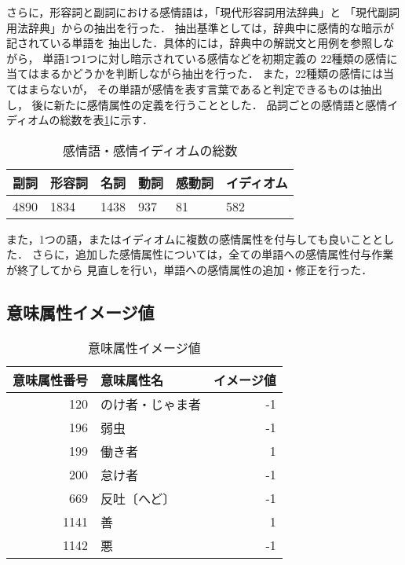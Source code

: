 \documentclass[japanese]{jnlp_1.3c}
\begin{document}
さらに，形容詞と副詞における感情語は，「現代形容詞用法辞典」\cite{adjective}と
「現代副詞用法辞典」\cite{adverb}からの抽出を行った．
抽出基準としては，辞典中に感情的な暗示が記されている単語を
抽出した．具体的には，辞典中の解説文と用例を参照しながら，
単語1つ1つに対し暗示されている感情などを初期定義の
22種類の感情に当てはまるかどうかを判断しながら抽出を行った．
また，22種類の感情には当てはまらないが，
その単語が感情を表す言葉であると判定できるものは抽出し，
後に新たに感情属性の定義を行うこととした．
品詞ごとの感情語と感情イディオムの総数を表\ref{tb:eword}に示す．

\begin{table}[t]
\begin{center}
\caption{感情語・感情イディオムの総数}
\begin{tabular}{|p{2cm}|p{2cm}|p{2cm}|p{2cm}|p{2cm}|p{2cm}|}
\hline
副詞	&	形容詞	&	名詞	&	動詞 & 感動詞 & イディオム	\\ \hline
4890	&	1834	& 1438	&  937  & 81     & 582		\\ \hline
\end{tabular}
\label{tb:eword}
\end{center}
\end{table}
また，1つの語，またはイディオムに複数の感情属性を付与しても良いこととした．
さらに，追加した感情属性については，全ての単語への感情属性付与作業が終了してから
見直しを行い，単語への感情属性の追加・修正を行った．

\subsection{意味属性イメージ値}

\begin{table}[b]
\begin{center}
\caption{意味属性イメージ値}
\begin{tabular}{|r||l|r|}
\hline
意味属性番号	&	意味属性名	&	イメージ値	\\ \hline \hline
120	&	のけ者・じゃま者	&	-1	\\ \hline
196	&	弱虫	&	-1	\\ \hline
199	&	働き者	&	1	\\ \hline
200	&	怠け者	&	-1	\\ \hline
669	&	反吐〔へど〕	&	-1	\\ \hline
1141	&	善	&	1	\\ \hline
1142	&	悪	&	-1	\\ \hline
\end{tabular}
\label{tb:image_sem}
\end{center}
\end{table}
\end{document}
